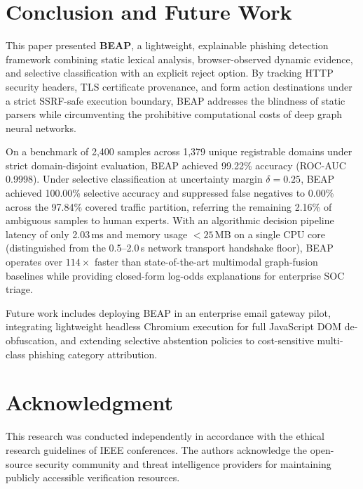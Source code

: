 \documentclass[conference]{IEEEtran}
\begin{document}
\section{Conclusion and Future Work}\label{conclusion}

This paper presented \textbf{BEAP}, a lightweight, explainable phishing detection framework combining static lexical analysis, browser-observed dynamic evidence, and selective classification with an explicit reject option. By tracking HTTP security headers, TLS certificate provenance, and form action destinations under a strict SSRF-safe execution boundary, BEAP addresses the blindness of static parsers while circumventing the prohibitive computational costs of deep graph neural networks.

On a benchmark of 2,400 samples across 1,379 unique registrable domains under strict domain-disjoint evaluation, BEAP achieved 99.22\% accuracy (ROC-AUC 0.9998). Under selective classification at uncertainty margin $\delta = 0.25$, BEAP achieved 100.00\% selective accuracy and suppressed false negatives to 0.00\% across the 97.84\% covered traffic partition, referring the remaining 2.16\% of ambiguous samples to human experts. With an algorithmic decision pipeline latency of only 2.03\,ms and memory usage $<25$\,MB on a single CPU core (distinguished from the 0.5--2.0\,s network transport handshake floor), BEAP operates over $114\times$ faster than state-of-the-art multimodal graph-fusion baselines while providing closed-form log-odds explanations for enterprise SOC triage.

Future work includes deploying BEAP in an enterprise email gateway pilot, integrating lightweight headless Chromium execution for full JavaScript DOM de-obfuscation, and extending selective abstention policies to cost-sensitive multi-class phishing category attribution.

\section*{Acknowledgment}
This research was conducted independently in accordance with the ethical research guidelines of IEEE conferences. The authors acknowledge the open-source security community and threat intelligence providers for maintaining publicly accessible verification resources.
\end{document}

